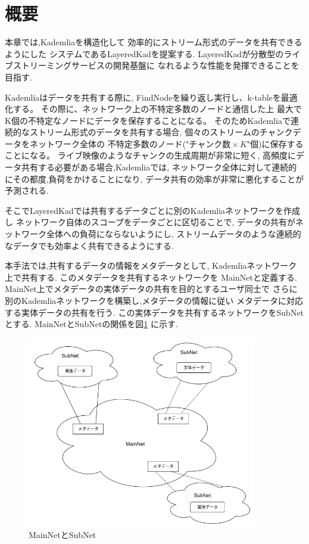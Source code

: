 \documentclass[sotsuron]{jcsie}
\begin{document}
\section{概要}
本章では,Kademliaを構造化して
効率的にストリーム形式のデータを共有できるようにした
システムであるLayeredKadを提案する.
LayeredKadが分散型のライブストリーミングサービスの開発基盤に
なれるような性能を発揮できることを目指す.

Kademliaはデータを共有する際に,
FindNodeを繰り返し実行し、k-tableを最適化する。
その際に、ネットワーク上の不特定多数のノードと通信した上
最大でK個の不特定なノードにデータを保存することになる。
そのためKademliaで連続的なストリーム形式のデータを共有する場合,
個々のストリームのチャンクデータをネットワーク全体の
不特定多数のノード("$ チャンク数 \times K $"個)に保存することになる。
ライブ映像のようなチャンクの生成周期が非常に短く,
高頻度にデータ共有する必要がある場合,Kademliaでは,
ネットワーク全体に対して連続的にその都度,負荷をかけることになり,
データ共有の効率が非常に悪化することが予測される.

そこでLayeredKadでは共有するデータごとに別のKademliaネットワークを作成し
ネットワーク自体のスコープをデータごとに区切ることで,
データの共有がネットワーク全体への負荷にならないようにし,
ストリームデータのような連続的なデータでも効率よく共有できるようにする.

本手法では,共有するデータの情報をメタデータとして,
Kademliaネットワーク上で共有する.
このメタデータを共有するネットワークを
MainNetと定義する.
MainNet上でメタデータの実体データの共有を目的とするユーザ同士で
さらに別のKademliaネットワークを構築し,メタデータの情報に従い
メタデータに対応する実体データの共有を行う.
この実体データを共有するネットワークをSubNetとする.
MainNetとSubNetの関係を図\ref{fig:image}
に示す.

\begin{figure}[H]
	\centering
	\includegraphics[width=10cm]{./assets/image/image.png}
	\caption{MainNetとSubNet}
	\label{fig:image}
\end{figure}
\end{document}
